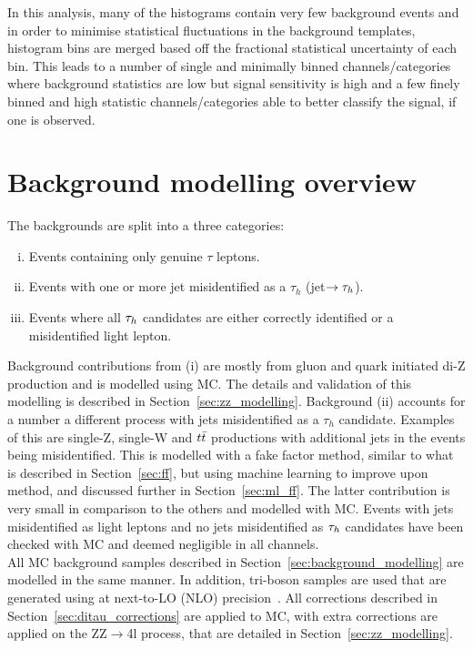 In this analysis, many of the histograms contain very few background events and in order to minimise statistical fluctuations in the background templates, histogram bins are merged based off the fractional statistical uncertainty of each bin.
This leads to a number of single and minimally binned channels/categories where background statistics are low but signal sensitivity is high and a few finely binned and high statistic channels/categories able to better classify the signal, if one is observed.
 
\section{Background modelling overview}

The backgrounds are split into a three categories:
\begin{enumerate}[i)]
  \item Events containing only genuine $\tau$ leptons.
  \item Events with one or more jet misidentified as a $\tau_h$ (jet$\rightarrow \tau_{h}$).
  \item Events where all $\tau_{h}$ candidates are either correctly identified or a misidentified light lepton. 
\end{enumerate}

Background contributions from (i) are mostly from gluon and quark initiated di-Z production and is modelled using MC.
The details and validation of this modelling is described in Section~\ref{sec:zz_modelling}.
Background (ii) accounts for a number a different process with jets misidentified as a $\tau_h$ candidate.
Examples of this are single-Z, single-W and $t\bar{t}$ productions with additional jets in the events being misidentified.
This is modelled with a fake factor method, similar to what is described in Section~\ref{sec:ff}, but using machine learning to improve upon method, and discussed further in Section~\ref{sec:ml_ff}.
The latter contribution is very small in comparison to the others and modelled with MC.
Events with jets misidentified as light leptons and no jets misidentified as $\tau_{h}$ candidates have been checked with MC and deemed negligible in all channels. \\

All MC background samples described in Section~\ref{sec:background_modelling} are modelled in the same manner.  
In addition, tri-boson samples are used that are generated using \MGvATNLO at next-to-LO (NLO) precision~\cite{Alwall:2011uj}.
All corrections described in Section~\ref{sec:ditau_corrections} are applied to MC, with extra corrections are applied on the ZZ$\rightarrow$4l process, that are detailed in Section~\ref{sec:zz_modelling}.

